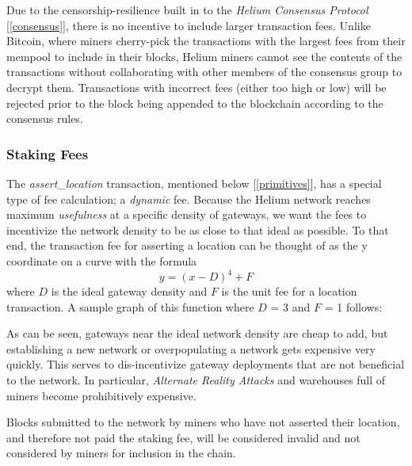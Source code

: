 \documentclass[10pt, nonatbib, nocopyrightspace, reprint]{sigplanconf}
\newcommand{\secref}[1]{[\autoref{#1}]}
\begin{document}
Due to the censorship-resilience built in to the \emph{Helium Consensus Protocol} \secref{consensus}, there is no incentive to include larger transaction fees. Unlike Bitcoin, where miners cherry-pick the transactions with the largest fees from their mempool to include in their blocks, Helium miners cannot see the contents of the transactions without collaborating with other members of the consensus group to decrypt them. Transactions with incorrect fees (either too high or low) will be rejected prior to the block being appended to the blockchain according to the consensus rules.

\subsubsection{Staking Fees} \label{staking}

The \emph{assert\_location} transaction, mentioned below \secref{primitives}, has a special type of fee calculation; a \emph{dynamic} fee. Because the Helium network reaches maximum \emph{usefulness} at a specific density of gateways, we want the fees to incentivize the network density to be as close to that ideal as possible. To that end, the transaction fee for asserting a location can be thought of as the y coordinate on a curve with the formula \[\mathit{y = \left(x - D\right)^4 + F}\] where $D$ is the ideal gateway density and $F$ is the unit fee for a location transaction. A sample graph of this function where $D$ = 3 and $F$ = 1 follows:

\pgfplotsset{width=12cm,compat=1.9}

As can be seen, gateways near the ideal network density are cheap to add, but establishing a new network or overpopulating a network gets expensive very quickly. This serves to dis-incentivize gateway deployments that are not beneficial to the network. In particular, \emph{Alternate Reality Attacks} and warehouses full of miners become prohibitively expensive.

Blocks submitted to the network by miners who have not asserted their location, and therefore not paid the staking fee, will be considered invalid and not considered by miners for inclusion in the chain.
\end{document}

